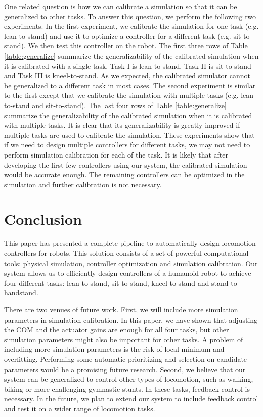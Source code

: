 
One related question is how we can calibrate a simulation so that it can be generalized to other tasks. To answer this question, we perform the following two experiments. In the first experiment, we calibrate the simulation for one task (e.g. lean-to-stand) and use it to optimize a controller for a different task (e.g. sit-to-stand). We then test this controller on the robot. The first three rows of Table \ref{table:generalize} summarize the generalizability of the calibrated simulation when it is calibrated with a single task. Task I is lean-to-stand. Task II is sit-to-stand and Task III is kneel-to-stand. As we expected, the calibrated simulator cannot be generalized to a different task in most cases. The second experiment is similar to the first except that we calibrate the simulation with multiple tasks (e.g. lean-to-stand and sit-to-stand). The last four rows of Table \ref{table:generalize} summarize the generalizability of the calibrated simulation when it is calibrated with multiple tasks. It is clear that its generalizability is greatly improved if multiple tasks are used to calibrate the simulation. These experiments show that if we need to design multiple controllers for different tasks, we may not need to perform simulation calibration for each of the task. It is likely that after developing the first few controllers using our system, the calibrated simulation would be accurate enough. The remaining controllers can be optimized in the simulation and further calibration is not necessary.

\section{Conclusion}

This paper has presented a complete pipeline to automatically design locomotion controllers for robots. This solution consists of a set of powerful computational tools: physical simulation, controller optimization and simulation calibration. Our system allows us to efficiently design controllers of a humanoid robot to achieve four different tasks: lean-to-stand, sit-to-stand, kneel-to-stand and stand-to-handstand.

There are two venues of future work. First, we will include more simulation parameters in simulation calibration. In this paper, we have shown that adjusting the COM and the actuator gains are enough for all four tasks, but other simulation parameters might also be important for other tasks. A problem of including more simulation parameters is the risk of local minimum and overfitting. Performing some automatic prioritizing and selection on candidate parameters would be a promising future research. Second, we believe that our system can be generalized to control other types of locomotion, such as walking, biking or more challenging gymnastic stunts. In these tasks, feedback control is necessary. In the future, we plan to extend our system to include feedback control and test it on a wider range of locomotion tasks.
